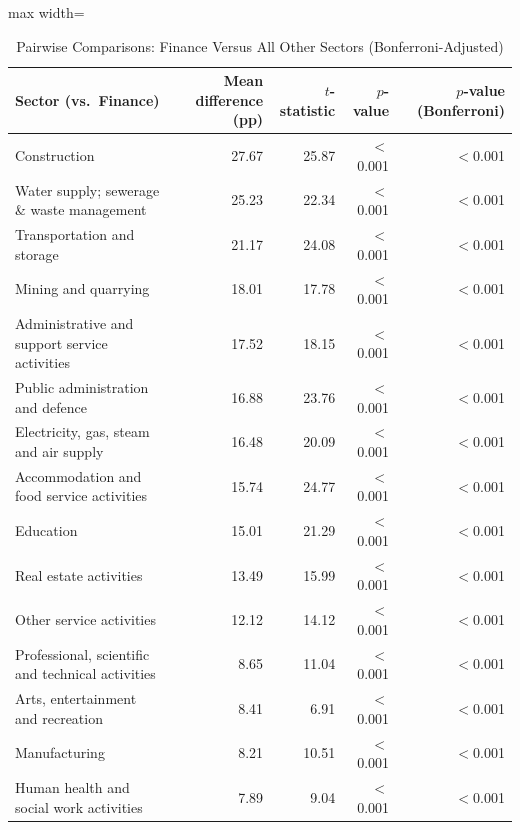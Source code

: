\documentclass[12pt,a4paper]{article}
\begin{document}
\begin{table}[htbp]
\caption{Pairwise Comparisons: Finance Versus All Other Sectors (Bonferroni-Adjusted)}
\label{tab:financepairwise}
\begin{threeparttable}
\begin{adjustbox}{max width=\textwidth}
\begin{tabular}{lrrrr}
\toprule
Sector (vs.\ Finance) & Mean difference (pp) & $t$-statistic & $p$-value & $p$-value (Bonferroni) \\
\midrule
Construction                                        & 27.67 & 25.87 & $<$0.001 & $<$0.001 \\
Water supply; sewerage \& waste management          & 25.23 & 22.34 & $<$0.001 & $<$0.001 \\
Transportation and storage                          & 21.17 & 24.08 & $<$0.001 & $<$0.001 \\
Mining and quarrying                                & 18.01 & 17.78 & $<$0.001 & $<$0.001 \\
Administrative and support service activities       & 17.52 & 18.15 & $<$0.001 & $<$0.001 \\
Public administration and defence                   & 16.88 & 23.76 & $<$0.001 & $<$0.001 \\
Electricity, gas, steam and air supply               & 16.48 & 20.09 & $<$0.001 & $<$0.001 \\
Accommodation and food service activities           & 15.74 & 24.77 & $<$0.001 & $<$0.001 \\
Education                                           & 15.01 & 21.29 & $<$0.001 & $<$0.001 \\
Real estate activities                              & 13.49 & 15.99 & $<$0.001 & $<$0.001 \\
Other service activities                            & 12.12 & 14.12 & $<$0.001 & $<$0.001 \\
Professional, scientific and technical activities   &  8.65 & 11.04 & $<$0.001 & $<$0.001 \\
Arts, entertainment and recreation                  &  8.41 &  6.91 & $<$0.001 & $<$0.001 \\
Manufacturing                                       &  8.21 & 10.51 & $<$0.001 & $<$0.001 \\
Human health and social work activities             &  7.89 &  9.04 & $<$0.001 & $<$0.001 \\

\end{tabular}
\end{adjustbox}
\end{threeparttable}
\end{table}
\end{document}

